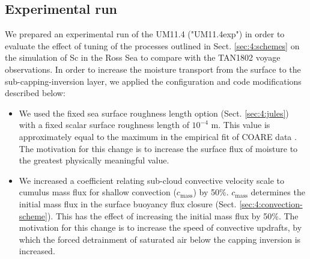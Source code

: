 \subsection{Experimental run}
\label{sec:4:experimental-run}

We prepared an experimental run of the UM11.4 ("UM11.4exp") in order
to evaluate the effect of tuning of the processes outlined in Sect. 
\ref{sec:4:schemes} on the simulation of Sc in the Ross Sea to compare
with the TAN1802 voyage observations. 
In order to increase the moisture transport from the surface to the sub-capping-inversion layer, we applied the configuration and code modifications described below:

\begin{itemize}
\item We used the fixed sea surface roughness length option
(Sect. \ref{sec:4:jules}) with a fixed scalar surface roughness length of $10^{-4}$
m. This value is approximately equal to the maximum in the empirical
fit of COARE data \citep{fairall2003}. The motivation for this change is to increase
the surface flux of moisture to the greatest physically meaningful value.
\item We increased a coefficient relating sub-cloud convective velocity scale
to cumulus mass flux for shallow convection ($c_\text{mass}$) by 50\%. 
$c_\text{mass}$ determines the initial mass flux in the surface buoyancy
flux closure (Sect. \ref{sec:4:convection-scheme}). This has the effect
of increasing the initial mass flux by 50\%. The motivation for this change
is to increase the speed of convective updrafts, by which the forced
detrainment of saturated air below the capping inversion is increased.
\end{itemize}

\begin{table}
\caption[Diagnostic model levels and layers]{
Diagnostic model levels and layers relevant to shallow boundary layer convection, turbulence
and cloud, listed from the lowest to the highest.
}
\label{tab:4:levels}
\centering
{}
\end{table}


